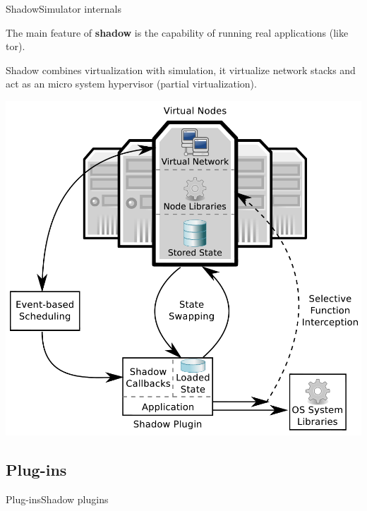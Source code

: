 \begin{frame}{Shadow}{Simulator internals}
	\begin{minipage}{\textwidth}
	The main feature of \textbf{shadow} is the capability of running real
	applications (like tor).
	\end{minipage}
	\begin{minipage}{0.45\textwidth}
	\small
	Shadow combines virtualization with simulation, it virtualize network
	stacks and act as an micro system hypervisor (partial virtualization).
	\normalsize
	\end{minipage}
	\begin{minipage}{0.4\textwidth}
	\begin{center}
		\includegraphics[scale=0.17]{img/shadow.png}
	\end{center}
	\end{minipage}
\end{frame}

\subsection{Plug-ins}

\begin{frame}{Plug-ins}{Shadow plugins}
\end{frame}

